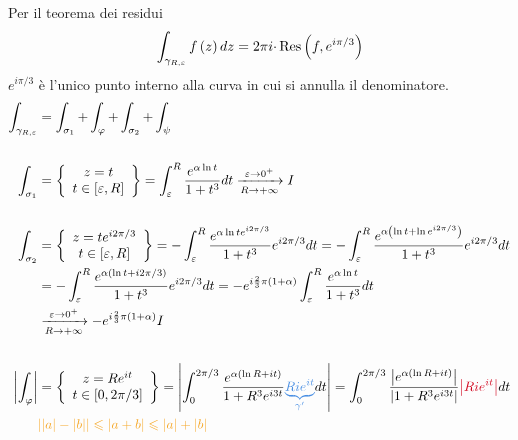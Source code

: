 Per il teorema dei residui
\begin{equation*}
\int _{\gamma _{R,\varepsilon }} f\left( z\right) dz=2\pi i\cdotp \operatorname{Res} \left( f,e^{i\pi /3}\right)
\end{equation*}
$e^{i\pi /3}$ è l'unico punto interno alla curva in cui si annulla il denominatore.
\begin{equation*}
\begin{aligned}
\int _{\gamma _{R,\varepsilon }} & =\int _{\sigma _{1}} +\int _{\varphi } +\int _{\sigma _{2}} +\int _{\psi }\\
 & \\
\int _{\sigma _{1}} & =\left\{\begin{array}{ c }
z=t\\
t\in [ \varepsilon ,R]
\end{array}\right\} =\int ^{R}_{\varepsilon }\frac{e^{\alpha \ln t}}{1+t^{3}} dt\xrightarrow[R\rightarrow +\infty ]{\varepsilon \rightarrow 0^{+}} I\\
 & \\
\int _{\sigma _{2}} & =\left\{\begin{array}{ c }
z=te^{i2\pi /3}\\
t\in [ \varepsilon ,R]
\end{array}\right\} =-\int ^{R}_{\varepsilon }\frac{e^{\alpha \ln te^{i2\pi /3}}}{1+t^{3}} e^{i2\pi /3} dt=-\int ^{R}_{\varepsilon }\frac{e^{\alpha \left(\ln t+\ln e^{i2\pi /3}\right)}}{1+t^{3}} e^{i2\pi /3} dt\\
 & =-\int ^{R}_{\varepsilon }\frac{e^{\alpha (\ln t+i2\pi /3)}}{1+t^{3}} e^{i2\pi /3} dt=-e^{i\frac{2}{3} \pi ( 1+\alpha )}\int ^{R}_{\varepsilon }\frac{e^{\alpha \ln t}}{1+t^{3}} dt\\
 & \xrightarrow[R\rightarrow +\infty ]{\varepsilon \rightarrow 0^{+}} -e^{i\frac{2}{3} \pi ( 1+\alpha )} I\\
 & \\
\left| \int _{\varphi }\right|  & =\left\{\begin{array}{ c }
z=Re^{it}\\
t\in [ 0,2\pi /3]
\end{array}\right\} =\left| \int ^{2\pi /3}_{0}\frac{e^{\alpha (\ln R+it)}}{1+R^{3} e^{i3t}}\textcolor[rgb]{0.29,0.56,0.89}{\underbrace{Rie^{it}}_{\gamma '}} dt\right| =\int ^{2\pi /3}_{0}\frac{\left| e^{\alpha (\ln R+it)}\right| }{\left| 1+R^{3} e^{i3t}\right| }\textcolor[rgb]{0.82,0.01,0.11}{\left| Rie^{it}\right| } dt\\
 & \textcolor[rgb]{0.96,0.65,0.14}{| | a| -| b| | \leqslant | a+b| \leqslant | a| +| b| }\\

\end{aligned}
\end{equation*}
